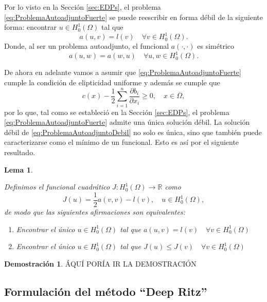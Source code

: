 \documentclass[a4paper,11pt,spanish, twoside, leqno]{tfg-uam}
\newtheorem{lema}[teor]{Lema}
\theoremstyle{definition}
\newtheorem{dem}[teor]{Demostración}
\begin{document}
Por lo visto en la Sección \ref{sec:EDPs}, el problema \eqref{eq:ProblemaAutoadjuntoFuerte} se puede reescribir en forma débil de la siguiente forma: encontrar $u\in H_0^1(\Omega)$ tal que
\begin{equation}\label{eq:ProblemaAutoadjuntoDebil}
    a(u,v) = l(v) \quad \forall v\in  H_0^1(\Omega).
\end{equation}
Donde, al ser un problema autoadjunto, el funcional $a(\cdot,\cdot)$ es simétrico
\begin{equation*}
    a(u,w) = a(w,u) \quad \forall u,w\in H_0^1(\Omega).
\end{equation*}

De ahora en adelante vamos a asumir que \eqref{eq:ProblemaAutoadjuntoFuerte} cumple la condición de elipticidad uniforme y además se cumple que
\begin{equation*}
    c(x) - \frac{1}{2} \sum_{i=1}^n \frac{\partial b_i}{\partial x_i} \geq 0, \quad x \in \overline{\Omega},
\end{equation*}
por lo que, tal como se estableció en la Sección \ref{sec:EDPs}, el problema \eqref{eq:ProblemaAutoadjuntoFuerte} admite una única solución débil. La solución débil de \eqref{eq:ProblemaAutoadjuntoDebil} no solo es única, sino que también puede caracterizarse como el mínimo de un funcional. Esto es así por el siguiente resultado.



\begin{lema} \label{lema:MinimoFuncion}
    
    Definimos el funcional cuadrático $J: H_0^1(\Omega) \to \mathbb{R}$ como
    \begin{equation*}
        J(u) = \frac{1}{2}a(v,v) - l(v), \quad u\in H_0^1(\Omega),
    \end{equation*}
    de modo que las siguientes afirmaciones son equivalentes:
    \begin{enumerate}
        \item Encontrar el único $u\in H_0^1(\Omega)$ tal que $a(u,v) = l(v) \quad \forall v\in H_0^1(\Omega)$
        \item Encontrar el único $u\in H_0^1(\Omega)$ tal que $J(u) \leq J(v) \quad \forall v\in H_0^1(\Omega)$
    \end{enumerate}
\end{lema}
\begin{dem}
    ÁQUÍ PORÍA IR LA DEMOSTRACIÓN
\end{dem}

\subsection{Formulación del método ``Deep Ritz''}
\end{document}
